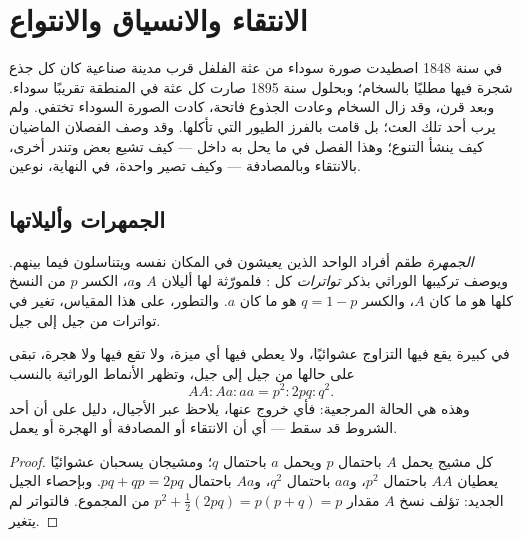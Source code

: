 \chapter{الانتقاء والانسياق والانتواع}\label{ch:g12:selection-drift-speciation}

في سنة 1848 اصطيدت صورة سوداء من عثة الفلفل قرب مدينة صناعية كان كل
جذع شجرة فيها مطليًا بالسخام؛ وبحلول سنة 1895 صارت كل عثة في المنطقة
تقريبًا سوداء. وبعد قرن، وقد زال السخام وعادت الجذوع فاتحة، كادت الصورة
السوداء تختفي. ولم يرب أحد تلك العث؛ بل قامت بالفرز الطيور التي تأكلها.
وقد وصف الفصلان الماضيان كيف ينشأ التنوع؛ وهذا الفصل في ما يحل به داخل
 --- كيف تشيع بعض  وتندر أخرى، بالانتقاء وبالمصادفة ---
وكيف تصير  واحدة، في النهاية، نوعين.

\section{الجمهرات وأليلاتها}

\begin{definition}\label{def:g12:selection-drift-speciation:population}
\emph{الجمهرة} طقم أفراد  الواحد الذين يعيشون في
المكان نفسه ويتناسلون فيما بينهم. ويوصف تركيبها الوراثي بذكر
\emph{تواترات}  كل : فلمورّثة لها
أليلان $A$ و$a$، الكسر $p$ من النسخ كلها هو ما كان $A$، والكسر
$q = 1 - p$ هو ما كان $a$. والتطور، على هذا المقياس، تغير في تواترات
 من جيل إلى جيل.
\end{definition}

\begin{proposition}\label{prop:g12:selection-drift-speciation:hw}
في  كبيرة يقع فيها التزاوج عشوائيًا، ولا يعطي فيها أي  ميزة،
ولا تقع فيها  ولا هجرة، تبقى   على حالها من جيل إلى
جيل، وتظهر الأنماط الوراثية بالنسب
\[
AA : Aa : aa = p^2 : 2pq : q^2 .
\]
وهذه هي الحالة المرجعية: فأي خروج عنها، يلاحظ عبر الأجيال، دليل على أن
أحد الشروط قد سقط --- أي أن الانتقاء أو المصادفة أو الهجرة أو 
يعمل.
\end{proposition}
\begin{proof}
كل مشيج يحمل $A$ باحتمال $p$ ويحمل $a$ باحتمال $q$؛ ومشيجان يسحبان
عشوائيًا يعطيان $AA$ باحتمال $p^2$، و$aa$ باحتمال $q^2$، و$Aa$ باحتمال
$pq + qp = 2pq$. وبإحصاء  الجيل الجديد: تؤلف نسخ $A$ مقدار
$p^2 + \tfrac12 (2pq) =
p(p + q) = p$ من المجموع. فالتواتر لم يتغير.
\end{proof}

